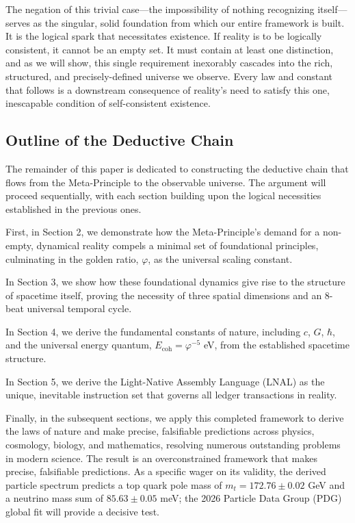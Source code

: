 The negation of this trivial case—the impossibility of nothing recognizing itself—serves as the singular, solid foundation from which our entire framework is built. It is the logical spark that necessitates existence. If reality is to be logically consistent, it cannot be an empty set. It must contain at least one distinction, and as we will show, this single requirement inexorably cascades into the rich, structured, and precisely-defined universe we observe. Every law and constant that follows is a downstream consequence of reality's need to satisfy this one, inescapable condition of self-consistent existence.

\subsection{Outline of the Deductive Chain}
The remainder of this paper is dedicated to constructing the deductive chain that flows from the Meta-Principle to the observable universe. The argument will proceed sequentially, with each section building upon the logical necessities established in the previous ones.

First, in Section 2, we demonstrate how the Meta-Principle's demand for a non-empty, dynamical reality compels a minimal set of foundational principles, culminating in the golden ratio, \(\varphi\), as the universal scaling constant.

In Section 3, we show how these foundational dynamics give rise to the structure of spacetime itself, proving the necessity of three spatial dimensions and an 8-beat universal temporal cycle.

In Section 4, we derive the fundamental constants of nature, including \(c\), \(G\), \(\hbar\), and the universal energy quantum, \(E_{\text{coh}} = \varphi^{-5}\) eV, from the established spacetime structure.

In Section 5, we derive the Light-Native Assembly Language (LNAL) as the unique, inevitable instruction set that governs all ledger transactions in reality.

Finally, in the subsequent sections, we apply this completed framework to derive the laws of nature and make precise, falsifiable predictions across physics, cosmology, biology, and mathematics, resolving numerous outstanding problems in modern science. The result is an overconstrained framework that makes precise, falsifiable predictions. As a specific wager on its validity, the derived particle spectrum predicts a top quark pole mass of \(m_t=172.76\pm0.02\) GeV and a neutrino mass sum of \(85.63 \pm 0.05\) meV; the 2026 Particle Data Group (PDG) global fit will provide a decisive test.

